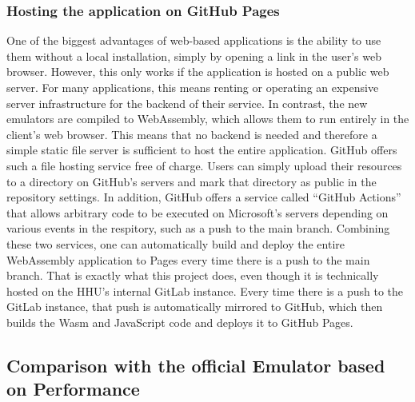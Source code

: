 
\subsubsection{Hosting the application on GitHub Pages}
One of the biggest advantages of web-based applications is the ability to use them without a local installation, simply by opening a link in the user's web browser.
However, this only works if the application is hosted on a public web server. For many applications, this means renting or operating an expensive server infrastructure for the backend of their service.
In contrast, the new emulators are compiled to WebAssembly, which allows them to run entirely in the client's web browser. This means that no backend is needed and therefore a simple static file server is sufficient to host the entire application.
GitHub offers such a file hosting service free of charge. Users can simply upload their resources to a directory on GitHub's servers and mark that directory as public in the repository settings.
In addition, GitHub offers a service called ``GitHub Actions'' that allows arbitrary code to be executed on Microsoft's servers depending on various events in the respitory, such as a push to the main branch.
Combining these two services, one can automatically build and deploy the entire WebAssembly application to Pages every time there is a push to the main branch.
That is exactly what this project does, even though it is technically hosted on the HHU's internal GitLab instance.
Every time there is a push to the GitLab instance, that push is automatically mirrored to GitHub, which then builds the Wasm and JavaScript code and deploys it to GitHub Pages.

\subsection{Comparison with the official Emulator based on Performance} \label{sec:benchmarks}

